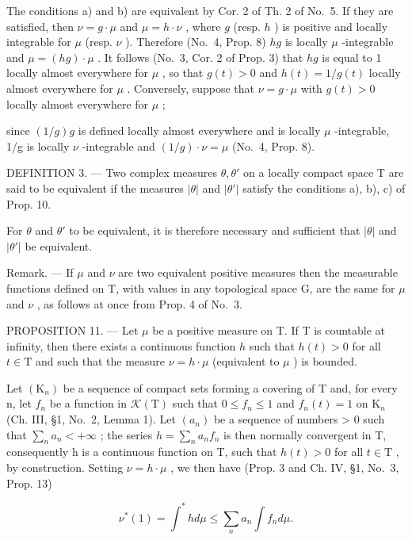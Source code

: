 The conditions a) and b) are equivalent by Cor. 2 of Th. 2 of No.~5. If they are satisfied, then \(\nu = g \cdot \mu\) and \(\mu = h \cdot \nu\) , where \(g\) (resp. \(h\) ) is positive and locally integrable for \(\mu\) (resp. \(\nu\) ). Therefore (No.~4, Prop. 8) \(hg\) is locally \(\mu\) -integrable and \(\mu = (hg) \cdot \mu\) . It follows (No.~3, Cor. 2 of Prop. 3) that \(hg\) is equal to 1 locally almost everywhere for \(\mu\) , so that \(g(t) > 0\) and \(h(t) = 1/g(t)\) locally almost everywhere for \(\mu\) . Conversely, suppose that \(\nu = g \cdot \mu\) with \(g(t) > 0\) locally almost everywhere for \(\mu\) ;

since \((1/g)g\) is defined locally almost everywhere and is locally \(\mu\) -integrable, 1/g is locally \(\nu\) -integrable and \((1/g)\cdot\nu=\mu\) (No.~4, Prop. 8).

DEFINITION 3. --- Two complex measures \(\theta, \theta'\) on a locally compact space T are said to be equivalent if the measures \(|\theta|\) and \(|\theta'|\) satisfy the conditions a), b), c) of Prop. 10.

For \(\theta\) and \(\theta'\) to be equivalent, it is therefore necessary and sufficient that \(|\theta|\) and \(|\theta'|\) be equivalent.

Remark. --- If \(\mu\) and \(\nu\) are two equivalent positive measures then the measurable functions defined on T, with values in any topological space G, are the same for \(\mu\) and \(\nu\) , as follows at once from Prop. 4 of No.~3.

PROPOSITION 11. --- Let \(\mu\) be a positive measure on T. If T is countable at infinity, then there exists a continuous function \(h\) such that \(h(t) > 0\) for all \(t \in \mathrm{T}\) and such that the measure \(\nu = h \cdot \mu\) (equivalent to \(\mu\) ) is bounded.

Let \((\mathrm{K}_{n})\) be a sequence of compact sets forming a covering of T and, for every n, let \(f_{n}\) be a function in \(\mathcal{K}(\mathrm{T})\) such that \(0 \leqslant f_{n} \leqslant 1\) and \(f_{n}(t) = 1\) on \(\mathrm{K}_{n}\) (Ch. III, §1, No.~2, Lemma 1). Let \((a_{n})\) be a sequence of numbers \textgreater{} 0 such that \(\sum_{n} a_{n} < +\infty\) ; the series \(h = \sum_{n} a_{n} f_{n}\) is then normally convergent in T, consequently h is a continuous function on T, such that \(h(t) > 0\) for all \(t \in \mathrm{T}\) , by construction. Setting \(\nu = h \cdot \mu\) , we then have (Prop. 3 and Ch. IV, §1, No.~3, Prop. 13)

\[
\nu^ {*} (1) = \int^ {*} h d \mu \leqslant \sum_ {n} a _ {n} \int f _ {n} d \mu .
\]

